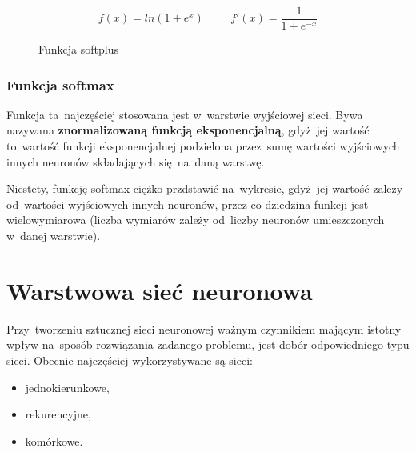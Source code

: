 \begin{minipage}[t]{\textwidth}
\begin{equation}
	f(x) = ln(1 + e^x)  \hspace{1cm} f'(x) = \frac{1}{1 + e^{-x}}
\end{equation}
\begin{figure}[H]
    \centering
    \caption{Funkcja softplus}
    \label{rys:f.softplus}
\end{figure}
\end{minipage}

\subsubsection{Funkcja softmax}
Funkcja ta~najczęściej stosowana jest w~warstwie wyjściowej sieci. Bywa nazywana \textbf{znormalizowaną funkcją
eksponencjalną}, gdyż~jej wartość to~wartość funkcji eksponencjalnej podzielona przez~sumę wartości wyjściowych innych
neuronów składających się~na~daną warstwę.

Niestety, funkcję softmax ciężko przdstawić na~wykresie, gdyż~jej wartość zależy od~wartości wyjściowych
innych neuronów, przez co dziedzina funkcji jest wielowymiarowa (liczba wymiarów zależy od~liczby neuronów
umieszczonych w~danej warstwie).

\section{Warstwowa sieć neuronowa}
Przy~tworzeniu sztucznej sieci neuronowej ważnym czynnikiem mającym istotny wpływ na~sposób rozwiązania
zadanego problemu, jest dobór odpowiedniego typu sieci. Obecnie najczęściej wykorzystywane są sieci:
\begin{itemize}
  \item jednokierunkowe,
  \item rekurencyjne,
  \item komórkowe.
\end{itemize}

